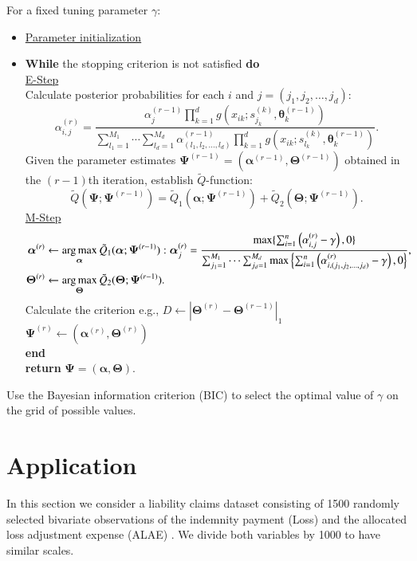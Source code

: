 \documentclass[eng]{csam}
\def\a{\alpha}
\def\argmax{\operatornamewithlimits{arg\,max}}
\begin{document}
\begin{algorithm}[t]
\caption{Penalized EM algorithm}\label{alg:pem}
For a fixed tuning parameter $\gamma$:
\begin{itemize}
\item [] \underline{Parameter initialization}
\item [] \textbf{While} the stopping criterion is not satisfied \textbf{do}\\
\underline{E-Step}\\
Calculate posterior probabilities for each $i$ and $j = (j_1,j_2,\ldots,j_d)$:
\begin{equation*}
\a^{(r)}_{i,j} = \frac{\a^{(r-1)}_{j} \prod_{k=1}^d g(x_{ik};s^{(k)}_{j_k}, \bm{\theta}^{(r-1)}_k)}{\sum_{l_1 = 1}^{M_1} \cdots\sum_{l_d = 1}^{M_d}\a^{(r-1)}_{(l_1,l_2,\ldots,l_d)} \prod_{k=1}^d g(x_{ik};s^{(k)}_{l_k}, \bm{\theta}^{(r-1)}_k)}.
\end{equation*}
Given the parameter estimates $\bm{\Psi}^{(r-1)} = (\bm{\a}^{(r-1)}, \bm{\Theta}^{(r-1)})$ obtained in the $(r-1)$th iteration, establish $\tilde{Q}$-function:
\begin{equation*}
\tilde{Q}(\bm{\Psi};\bm{\Psi}^{(r-1)}) = \tilde{Q}_1(\bm{\a};\bm{\Psi}^{(r-1)}) + \tilde{Q}_2(\bm{\Theta};\bm{\Psi}^{(r-1)}).
\end{equation*}
\underline{M-Step}
\begin{align*}
\bm{\a}^{(r)} &\leftarrow \argmax_{\bm{\a}} \tilde{Q}_1(\bm{\a};\bm{\Psi}^{(r-1)}): \bm{\a}^{(r)}_{j} = \frac{\max\{\sum_{i=1}^n \left(\a^{(r)}_{i,j}-\gamma\right), 0\}}{\sum_{j_1 = 1}^{M_1}\cdots\sum_{j_d = 1}^{M_d} \max\left\{\sum_{i=1}^n \left(\a^{(r)}_{i,(j_1,j_2,\ldots,j_d)}-\gamma\right), 0 \right\}},\\
\bm{\Theta}^{(r)} &\leftarrow \argmax_{\bm{\Theta}} \tilde{Q}_2(\bm{\Theta};\bm{\Psi}^{(r-1)}).
\end{align*}
Calculate the criterion e.g., $D \leftarrow |\bm{\Theta}^{(r)} - \bm{\Theta}^{(r-1)}|_1$ \\
$\bm{\Psi}^{(r)} \leftarrow (\bm{\a}^{(r)}, \bm{\Theta}^{(r)})$\\
\textbf{end}\\
\textbf{return} $\bm{\Psi} = (\bm{\a}, \bm{\Theta})$.
\end{itemize}
Use the Bayesian information criterion (BIC) to select the optimal value of $\gamma$ on the grid of possible values.
\end{algorithm}


\section{Application}\label{sec5}
In this section we consider a liability claims dataset consisting of 1500 randomly selected bivariate observations of the indemnity payment (Loss) and the allocated loss adjustment expense (ALAE) \citep{Klugman1999}. We divide both variables by 1000 to have similar scales.
\end{document}
